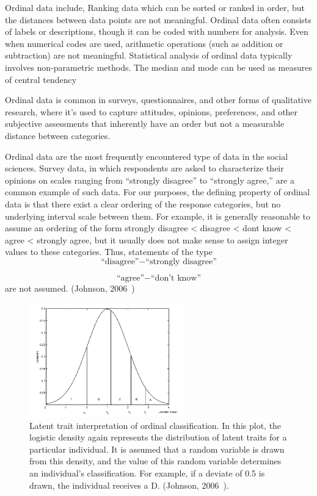 \documentclass{article}
\begin{document}
Ordinal data include, Ranking data which can be sorted or ranked in order, but the distances between data points are not meaningful.
Ordinal data often consists of labels or descriptions, though it can be coded with numbers for analysis. Even when numerical codes are used, arithmetic operations (such as addition or subtraction) are not meaningful.
Statistical analysis of ordinal data typically involves non-parametric methods. The median and mode can be used as measures of central tendency

Ordinal data is common in surveys, questionnaires, and other forms of qualitative research, where it's used to capture attitudes, opinions, preferences, and other subjective assessments that inherently have an order but not a measurable distance between categories. 

Ordinal data are the most frequently encountered type of data in the social
sciences. Survey data, in which respondents are asked to characterize their opinions
on scales ranging from “strongly disagree” to “strongly agree,” are a common
example of such data. For our purposes, the defining property of ordinal data
is that there exist a clear ordering of the response categories, but no underlying
interval scale between them. For example, it is generally reasonable to assume an
ordering of the form
strongly disagree < disagree < dont know < agree < strongly agree,
but it usually does not make sense to assign integer values to these categories.
Thus, statements of the type
\[
\text{``disagree''} - \text{``strongly disagree''}
\]

\[
\text{``agree''} - \text{``don't know''}
\]
are not assumed. (Johnson, 2006~\cite{Johnson1999})

\begin{figure}[ht!] %
    \centering %
    \includegraphics[width=0.6\textwidth]{images/ordinal_data_dist.png} %
    \caption{Latent trait interpretation of ordinal classification. 
    In this plot, the logistic density again represents the distribution of latent traits for a particular individual. 
    It is assumed that a random variable is drawn from this density, and the value of this random variable determines an individual's classification. 
    For example, if a deviate of 0.5 is drawn, the individual receives a D. (Johnson, 2006~\cite{Johnson1999}).} %
    \label{fig:ordinal} %
  \end{figure}
\end{document}

